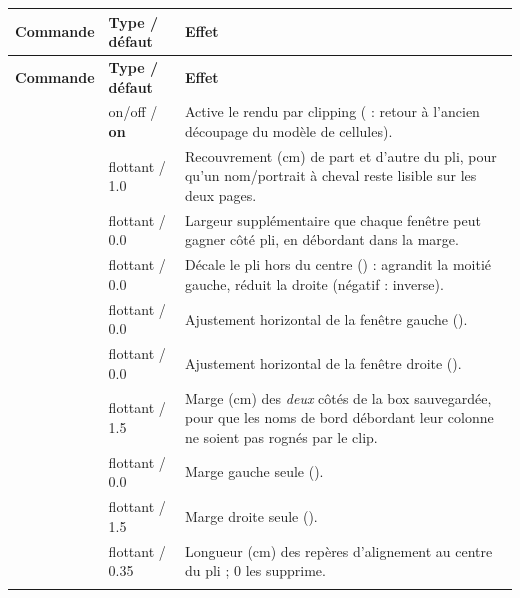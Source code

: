 \vspace{0.6em}

\begin{longtable}{C T F}
\toprule
\textbf{Commande} & \textbf{Type / défaut} & \textbf{Effet} \\
\midrule
\endfirsthead
\toprule
\textbf{Commande} & \textbf{Type / défaut} & \textbf{Effet} \\
\midrule
\endhead
\bottomrule
\endfoot

      & on/off / \textbf{on} & Active le rendu par clipping
( : retour à l'ancien découpage du modèle de cellules). \\
\addlinespace

   & flottant / 1.0 & Recouvrement (cm) de part et d'autre du
pli, pour qu'un nom/portrait à cheval reste lisible sur les deux pages. \\
\addlinespace

   & flottant / 0.0 & Largeur supplémentaire que chaque
fenêtre peut gagner côté pli, en débordant dans la marge. \\
\addlinespace

    & flottant / 0.0 & Décale le pli hors du centre
() : agrandit la moitié gauche, réduit la droite (négatif :
inverse). \\
\addlinespace

  & flottant / 0.0 & Ajustement horizontal de la fenêtre
gauche (). \\
\addlinespace

 & flottant / 0.0 & Ajustement horizontal de la fenêtre
droite (). \\
\addlinespace

       & flottant / 1.5 & Marge (cm) des \emph{deux} côtés de la
box sauvegardée, pour que les noms de bord débordant leur colonne ne soient pas
rognés par le clip. \\
\addlinespace

   & flottant / 0.0 & Marge gauche seule
(). \\
\addlinespace

  & flottant / 1.5 & Marge droite seule
(). \\
\addlinespace

      & flottant / 0.35 & Longueur (cm) des repères d'alignement
au centre du pli ; 0 les supprime. \\
\addlinespace


\end{longtable}
